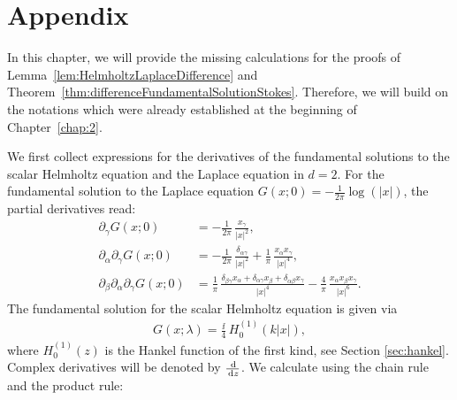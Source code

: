 \chapter*{Appendix}
\label{chap:app}

In this chapter, we will provide the missing calculations for the proofs of Lemma~\ref{lem:HelmholtzLaplaceDifference} and Theorem~\ref{thm:differenceFundamentalSolutionStokes}.
Therefore, we will build on the notations which were already established at the beginning of Chapter~\ref{chap:2}.

We first collect expressions for the derivatives of the fundamental solutions to the scalar Helmholtz equation and the Laplace equation in $d= 2$.
For the fundamental solution to the Laplace equation $G(x; 0) = -\frac{1}{2\pi} \log(|x|)$, the partial derivatives read:
\begin{align*}
  \partial_\gamma G(x; 0) &= -\frac{1}{2\pi} \, \frac{x_\gamma}{|x|^2}, \\[0.5em]
  \partial_\alpha \partial_\gamma G(x; 0) &= -\frac{1}{2\pi}\, \frac{\delta_{\alpha\gamma}}{|x|^2} + \frac{1}{\pi} \, \frac{x_\alpha x_\gamma}{|x|^4}, \\[0.5em]
  \partial_\beta \partial_\alpha \partial_\gamma G(x; 0)
  &= \frac{1}{\pi} \, \frac{\delta_{\beta \gamma} x_\alpha + \delta_{\alpha \gamma} x_\beta + \delta_{\alpha\beta} x_\gamma}{|x|^4} - \frac{4}{\pi}\, \frac{x_\alpha x_\beta x_\gamma}{|x|^6}.
\end{align*}
The fundamental solution for the scalar Helmholtz equation is given via 
\begin{align*}
  G(x; \lambda) = \frac{\ii}{4}\, H_0^{(1)}(k|x|),
\end{align*}
where $H_0^{(1)}(z)$ is the Hankel function of the first kind, see Section \ref{sec:hankel}.
Complex derivatives will be denoted by $\frac{\, {\operatorname{d}\!{}}}{\, {\operatorname{d}\!{z}}}$.
We calculate using the chain rule and the product rule:
